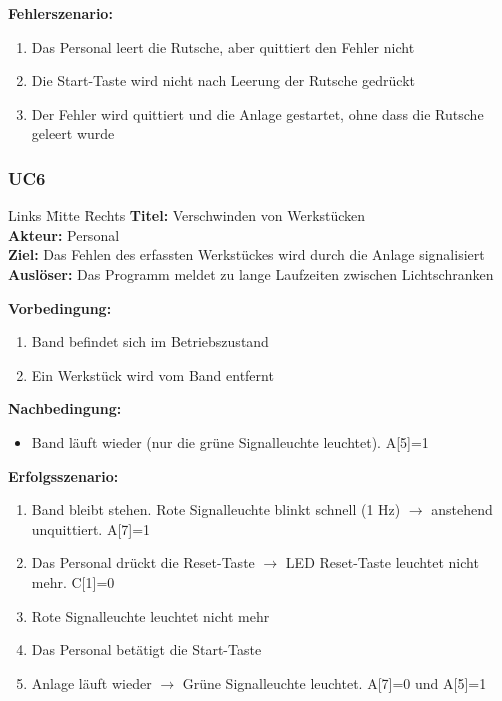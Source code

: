 \documentclass[oneside,a4paper,titlepage]{scrartcl}              %
\begin{document}
\textbf{Fehlerszenario:}
\begin{enumerate}
  \item Das Personal leert die Rutsche, aber quittiert den Fehler nicht
  \item Die Start-Taste wird nicht nach Leerung der Rutsche gedrückt
  \item Der Fehler wird quittiert und die Anlage gestartet, ohne dass die Rutsche geleert wurde
\end{enumerate}

\newpage

\subsubsection{UC6}
\begin{tabbing}
  Links \= Mitte \= Rechts \kill
  \textbf{Titel:}    \> \> Verschwinden von Werkstücken\\
  \textbf{Akteur:}   \> \> Personal\\
  \textbf{Ziel:}     \> \> Das Fehlen des erfassten Werkstückes wird durch die Anlage signalisiert\\
  \textbf{Auslöser:} \> \> Das Programm meldet zu lange Laufzeiten zwischen Lichtschranken\\
\end{tabbing}

\textbf{Vorbedingung:}
\begin{enumerate}
  \item Band befindet sich im Betriebszustand
  \item Ein Werkstück wird vom Band entfernt
\end{enumerate}

\textbf{Nachbedingung:}
\begin{itemize}
  \item Band läuft wieder (nur die grüne Signalleuchte leuchtet). A[5]=1
\end{itemize}

\textbf{Erfolgsszenario:}
\begin{enumerate}
  \item Band bleibt stehen. Rote Signalleuchte blinkt schnell (1 Hz) $\rightarrow$ anstehend unquittiert. A[7]=1
  \item Das Personal drückt die Reset-Taste $\rightarrow$ LED Reset-Taste leuchtet nicht mehr. C[1]=0
  \item Rote Signalleuchte leuchtet nicht mehr
  \item Das Personal betätigt die Start-Taste
  \item Anlage läuft wieder $\rightarrow$ Grüne Signalleuchte leuchtet. A[7]=0 und A[5]=1
\end{enumerate}
\end{document}
